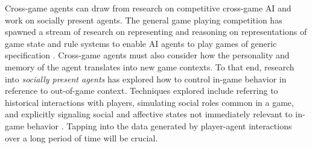 \documentclass[conference]{IEEEtran}
\newcommand{\mytodo}[1]{\textbf{[[#1]]}}
\begin{document}
Cross-game agents can draw from research on competitive cross-game AI and work on socially present agents. The general game playing competition has spawned a stream of research on representing and reasoning on representations of game state and rule systems to enable AI agents to play games of generic specification \cite{genesereth2005:general-game-playing}.
Cross-game agents must also consider how the personality and memory of the agent translates into new game contexts.
To that end, research into {\em socially present agents} has explored how to control in-game behavior in reference to out-of-game context. Techniques explored include referring to historical interactions with players, simulating social roles common in a game, and explicitly signaling social and affective states not immediately relevant to in-game behavior \cite{pereira2012:soc-boardgame}.
Tapping into the data generated by player-agent interactions over a long period of time will be crucial. 
%
%
\end{document}
